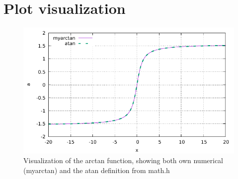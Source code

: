 \documentclass{article}
\begin{document}
\section{Plot visualization}


\begin{figure}
	\centering
	\includegraphics{plot.pdf}
	\caption{Visualization of the arctan function, showing both own numerical (myarctan) and the atan definition from math.h}
	\label{fig:plot}
\end{figure}
\end{document}
